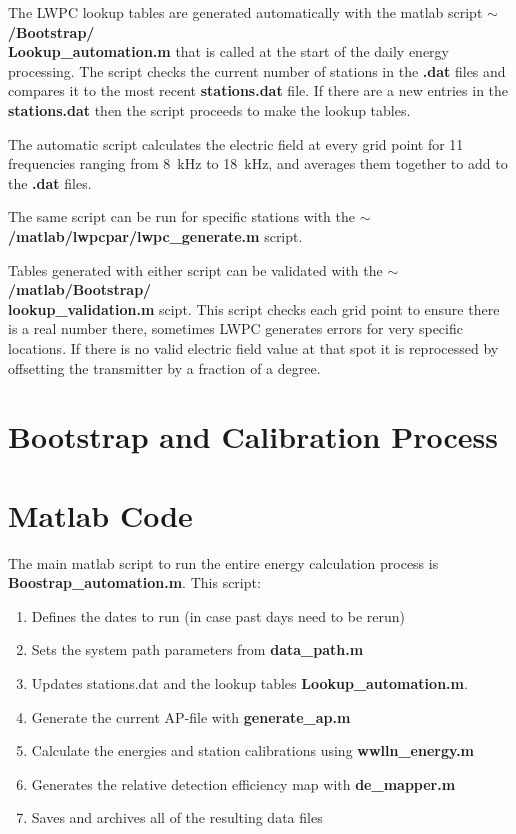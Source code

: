 The LWPC lookup tables are generated automatically with the matlab script {\bf $\sim$/Bootstrap/\\Lookup\_automation.m} that is called at the start of the daily energy processing.
The script checks the current number of stations in the \textbf{.dat} files and compares it to the most recent \textbf{stations.dat} file.
If there are a new entries in the \textbf{stations.dat} then the script proceeds to make the lookup tables.

The automatic script calculates the electric field at every grid point for 11 frequencies ranging from 8~kHz to 18~kHz, and averages them together to add to the \textbf{.dat} files.

The same script can be run for specific stations with the \textbf{$\sim$/matlab/lwpcpar/lwpc\_generate.m} script.

Tables generated with either script can be validated with the \textbf{$\sim$/matlab/Bootstrap/\\lookup\_validation.m} scipt.
This script checks each grid point to ensure there is a real number there, sometimes LWPC generates errors for very specific locations.
If there is no valid electric field value at that spot it is reprocessed by offsetting the transmitter by a fraction of a degree.

\section{Bootstrap and Calibration Process}

\section{Matlab Code}

The main matlab script to run the entire energy calculation process is {\bf Boostrap\_automation.m}.
This script:
\begin{enumerate}
\item{Defines the dates to run (in case past days need to be rerun)}
\item{Sets the system path parameters from {\bf data\_path.m}}
\item{Updates stations.dat and the lookup tables {\bf Lookup\_automation.m}.}
\item{Generate the current AP-file with {\bf generate\_ap.m}}
\item{Calculate the energies and station calibrations using {\bf wwlln\_energy.m}}
\item{Generates the relative detection efficiency map with {\bf de\_mapper.m}}
\item{Saves and archives all of the resulting data files}
\end{enumerate}

